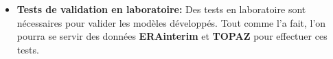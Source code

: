\begin{itemize}
    \item \textbf{Tests de validation en laboratoire:} Des tests en laboratoire sont nécessaires pour valider les modèles développés. Tout comme \citeauthor{rabatel2015thesis} l'a fait, l'on pourra se servir des données \textbf{ERAinterim} et \textbf{TOPAZ} pour effectuer ces tests.
\end{itemize}





